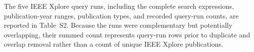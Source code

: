 \documentclass[12pt]{article}
\numberwithin{equation}{section}
\begin{document}








The five IEEE Xplore query runs, including the complete search
expressions, publication-year ranges, publication types, and recorded
query-run counts, are reported in Table~S2. Because the runs were
complementary but potentially overlapping, their summed count represents
query-run rows prior to duplicate and overlap removal rather than a count
of unique IEEE Xplore publications.
\end{document}
